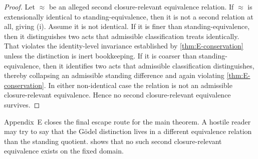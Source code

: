 \begin{proof}
Let $\approx$ be an alleged second closure-relevant equivalence relation. If $\approx$ is extensionally identical to standing-equivalence, then it is not a second relation at all, giving (i). Assume it is not identical. If it is finer than standing-equivalence, then it distinguishes two acts that admissible classification treats identically. That violates the identity-level invariance established by \cref{thm:E-conservation} unless the distinction is inert bookkeeping. If it is coarser than standing-equivalence, then it identifies two acts that admissible classification distinguishes, thereby collapsing an admissible standing difference and again violating \cref{thm:E-conservation}. In either non-identical case the relation is not an admissible closure-relevant equivalence. Hence no second closure-relevant equivalence survives.
\end{proof}

\begin{remark}
Appendix~E closes the final escape route for the main theorem. A hostile reader may try to say that the G\"odel distinction lives in a different equivalence relation than the standing quotient.  shows that no such second closure-relevant equivalence exists on the fixed domain.
\end{remark}

